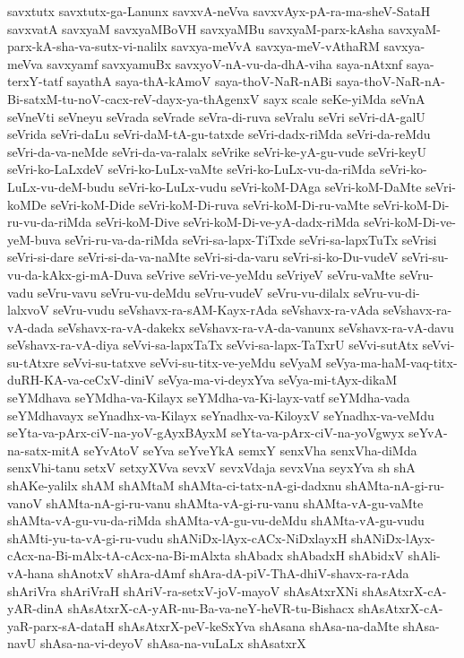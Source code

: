 {savxtutx
savxtutx-ga-Lanunx
savxvA-neVva
savxvAyx-pA-ra-ma-sheV-SataH
savxvatA
savxyaM
savxyaMBoVH
savxyaMBu
savxyaM-parx-kAsha
savxyaM-parx-kA-sha-va-sutx-vi-nalilx
savxya-meVvA
savxya-meV-vAthaRM
savxya-meVva
savxyamf
savxyamuBx
savxyoV-nA-vu-da-dhA-viha
saya-nAtxnf
saya-terxY-tatf
sayathA
saya-thA-kAmoV
saya-thoV-NaR-nABi
saya-thoV-NaR-nA-Bi-satxM-tu-noV-cacx-reV-dayx-ya-thAgenxV
sayx
scale
seKe-yiMda
seVnA
seVneVti
seVneyu
seVrada
seVrade
seVra-di-ruva
seVralu
seVri
seVri-dA-galU
seVrida
seVri-daLu
seVri-daM-tA-gu-tatxde
seVri-dadx-riMda
seVri-da-reMdu
seVri-da-va-neMde
seVri-da-va-ralalx
seVrike
seVri-ke-yA-gu-vude
seVri-keyU
seVri-ko-LaLxdeV
seVri-ko-LuLx-vaMte
seVri-ko-LuLx-vu-da-riMda
seVri-ko-LuLx-vu-deM-budu
seVri-ko-LuLx-vudu
seVri-koM-DAga
seVri-koM-DaMte
seVri-koMDe
seVri-koM-Dide
seVri-koM-Di-ruva
seVri-koM-Di-ru-vaMte
seVri-koM-Di-ru-vu-da-riMda
seVri-koM-Dive
seVri-koM-Di-ve-yA-dadx-riMda
seVri-koM-Di-ve-yeM-buva
seVri-ru-va-da-riMda
seVri-sa-lapx-TiTxde
seVri-sa-lapxTuTx
seVrisi
seVri-si-dare
seVri-si-da-va-naMte
seVri-si-da-varu
seVri-si-ko-Du-vudeV
seVri-su-vu-da-kAkx-gi-mA-Duva
seVrive
seVri-ve-yeMdu
seVriyeV
seVru-vaMte
seVru-vadu
seVru-vavu
seVru-vu-deMdu
seVru-vudeV
seVru-vu-dilalx
seVru-vu-di-lalxvoV
seVru-vudu
seVshavx-ra-sAM-Kayx-rAda
seVshavx-ra-vAda
seVshavx-ra-vA-dada
seVshavx-ra-vA-dakekx
seVshavx-ra-vA-da-vanunx
seVshavx-ra-vA-davu
seVshavx-ra-vA-diya
seVvi-sa-lapxTaTx
seVvi-sa-lapx-TaTxrU
seVvi-sutAtx
seVvi-su-tAtxre
seVvi-su-tatxve
seVvi-su-titx-ve-yeMdu
seVyaM
seVya-ma-haM-vaq-titx-duRH-KA-va-ceCxV-diniV
seVya-ma-vi-deyxYva
seVya-mi-tAyx-dikaM
seYMdhava
seYMdha-va-Kilayx
seYMdha-va-Ki-layx-vatf
seYMdha-vada
seYMdhavayx
seYnadhx-va-Kilayx
seYnadhx-va-KiloyxV
seYnadhx-va-veMdu
seYta-va-pArx-ciV-na-yoV-gAyxBAyxM
seYta-va-pArx-ciV-na-yoVgwyx
seYvA-na-satx-mitA
seYvAtoV
seYva
seYveYkA
semxY
senxVha
senxVha-diMda
senxVhi-tanu
setxV
setxyXVva
sevxV
sevxVdaja
sevxVna
seyxYva
sh
shA
shAKe-yalilx
shAM
shAMtaM
shAMta-ci-tatx-nA-gi-dadxnu
shAMta-nA-gi-ru-vanoV
shAMta-nA-gi-ru-vanu
shAMta-vA-gi-ru-vanu
shAMta-vA-gu-vaMte
shAMta-vA-gu-vu-da-riMda
shAMta-vA-gu-vu-deMdu
shAMta-vA-gu-vudu
shAMti-yu-ta-vA-gi-ru-vudu
shANiDx-lAyx-cACx-NiDxlayxH
shANiDx-lAyx-cAcx-na-Bi-mAlx-tA-cAcx-na-Bi-mAlxta
shAbadx
shAbadxH
shAbidxV
shAli-vA-hana
shAnotxV
shAra-dAmf
shAra-dA-piV-ThA-dhiV-shavx-ra-rAda
shAriVra
shAriVraH
shAriV-ra-setxV-joV-mayoV
shAsAtxrXNi
shAsAtxrX-cA-yAR-dinA
shAsAtxrX-cA-yAR-nu-Ba-va-neY-heVR-tu-Bishacx
shAsAtxrX-cA-yaR-parx-sA-dataH
shAsAtxrX-peV-keSxYva
shAsana
shAsa-na-daMte
shAsa-navU
shAsa-na-vi-deyoV
shAsa-na-vuLaLx
shAsatxrX
}
